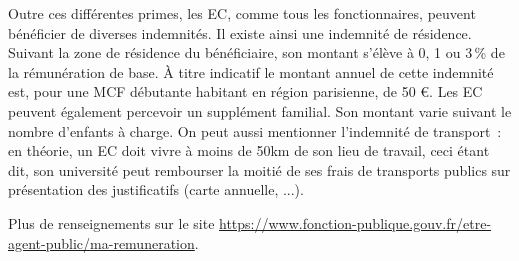 Outre ces diff\'erentes primes, les EC, comme tous les
fonctionnaires, peuvent b\'en\'eficier de diverses indemnit\'es. Il
existe ainsi une indemnit\'e de r\'esidence. Suivant la zone de
r\'esidence du b\'en\'eficiaire, son montant s'\'el\`eve \`a 0, 1 ou
3\,\% de la r\'emun\'eration de base. \`A titre indicatif le montant
annuel de cette indemnit\'e est, pour un\mp e MCF d\'ebutant\mp e habitant en
r\'egion parisienne, de 50 \euro{}. Les EC peuvent \'egalement
percevoir un suppl\'ement familial. Son montant varie suivant le
nombre d'enfants \`a charge. 
On peut aussi mentionner l'indemnit\'e de transport~: 
en th\'eorie, un EC doit vivre \`a moins de 50km de son lieu de travail, 
ceci \'etant dit, son universit\'e peut rembourser la moiti\'e de ses frais de transports publics sur pr\'esentation des justificatifs (carte annuelle, ...).

Plus de renseignements sur le site \url{https://www.fonction-publique.gouv.fr/etre-agent-public/ma-remuneration}.



